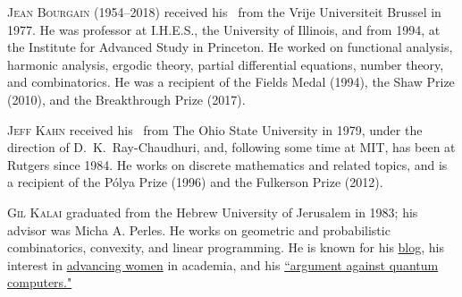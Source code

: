 \documentclass{toc}
\newcommand{\0}[0]{\emptyset}
\begin{document}
%
%
%
%
%
%
%
%
%
%
%
%
%
%
\begin{tocaboutauthors}
\begin{tocabout}[Bourgain]  %
  \textsc{Jean Bourgain (1954--2018)} received his \phd\ from the 
Vrije Universiteit Brussel in 1977. He was professor at I.H.E.S., the
University of Illinois, and from 1994, at 
the Institute for Advanced Study in Princeton. 
  He worked on functional analysis, harmonic analysis, 
ergodic theory, partial differential equations, number theory, and
  combinatorics.
%
%
%
%
%
He was a recipient of %
the Fields Medal (1994), the Shaw Prize (2010),
and the Breakthrough Prize (2017).  %
%
%
\end{tocabout}
\begin{tocabout}[Kahn]
  \textsc{Jeff Kahn}
received his \phd\ from The Ohio State University in 1979, 
under the direction of
%
D.~K.~Ray-Chaudhuri,  %
and, following some time at MIT, has been at Rutgers since 1984.  
He works on discrete mathematics and related topics, and is a recipient 
of the %
P\'olya  %
Prize (1996) and the Fulkerson Prize (2012).
\end{tocabout}
\begin{tocabout}[Kalai]
  \textsc{Gil Kalai}
  graduated from the Hebrew University of Jerusalem in 1983; 
his advisor was Micha A. Perles. He works on geometric and
  probabilistic %
  combinatorics, %
  convexity, and linear programming.
%
%
  He is known for his \href{https://gilkalai.wordpress.com/}{blog},
  his interest in
  \href{https://gilkalai.wordpress.com/2008/05/16/jerusalem-combinatorics-93/}{advancing women}
  in academia, and his %
\href{https://gilkalai.wordpress.com/2020/08/22/quantum-matters/}{``argument against quantum computers."}
%
%
%
\end{tocabout}
\end{tocaboutauthors}
\end{document}
